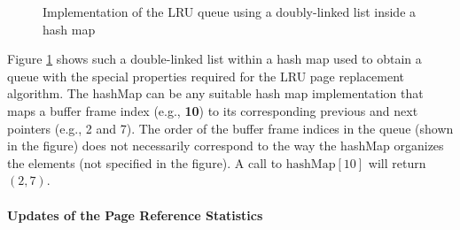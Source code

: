 \begin{@empty}
\begin{figure}[h]
{
        }
        \vspace{-.5em}
        \caption[LRU: Hash-Map-Doubly-Linked-List]{Implementation of the LRU queue using a doubly-linked list inside a hash map}
        \label{fig:hashmapdoublylinkedlist}
    \end{figure}
\end{@empty}

    Figure \ref{fig:hashmapdoublylinkedlist} shows such a double-linked list within a hash map used to obtain a queue with the special properties required for the LRU page replacement algorithm. The hashMap can be any suitable hash map implementation that maps a buffer frame index (e.g., \textbf{10}) to its corresponding previous and next pointers (e.g., \textcolor{black!75}{2} and \textcolor{black!75}{7}). The order of the buffer frame indices in the queue (shown in the figure) does not necessarily correspond to the way the hashMap organizes the elements (not specified in the figure). A call to $\text{hashMap}\left[10\right]$ will return $\left(2, 7\right)$.

\paragraph{Updates of the Page Reference Statistics}

